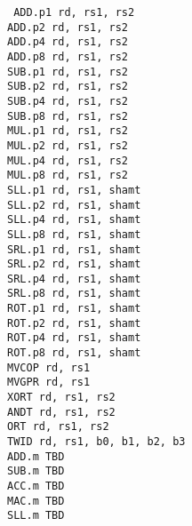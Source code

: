{\tt
ADD.p1  rd, rs1, rs2            \\
ADD.p2  rd, rs1, rs2            \\
ADD.p4  rd, rs1, rs2            \\
ADD.p8  rd, rs1, rs2            \\
SUB.p1  rd, rs1, rs2            \\
SUB.p2  rd, rs1, rs2            \\
SUB.p4  rd, rs1, rs2            \\
SUB.p8  rd, rs1, rs2            \\
MUL.p1  rd, rs1, rs2            \\
MUL.p2  rd, rs1, rs2            \\
MUL.p4  rd, rs1, rs2            \\
MUL.p8  rd, rs1, rs2            \\
SLL.p1  rd, rs1, shamt          \\
SLL.p2  rd, rs1, shamt          \\
SLL.p4  rd, rs1, shamt          \\
SLL.p8  rd, rs1, shamt          \\
SRL.p1  rd, rs1, shamt          \\
SRL.p2  rd, rs1, shamt          \\
SRL.p4  rd, rs1, shamt          \\
SRL.p8  rd, rs1, shamt          \\
ROT.p1  rd, rs1, shamt          \\
ROT.p2  rd, rs1, shamt          \\
ROT.p4  rd, rs1, shamt          \\
ROT.p8  rd, rs1, shamt          \\
MVCOP   rd, rs1                 \\
MVGPR   rd, rs1                 \\
XORT    rd, rs1, rs2            \\
ANDT    rd, rs1, rs2            \\
ORT     rd, rs1, rs2            \\
TWID    rd, rs1, b0, b1, b2, b3 \\
ADD.m   TBD                     \\
SUB.m   TBD                     \\
ACC.m   TBD                     \\
MAC.m   TBD                     \\
SLL.m   TBD                     \\
}
